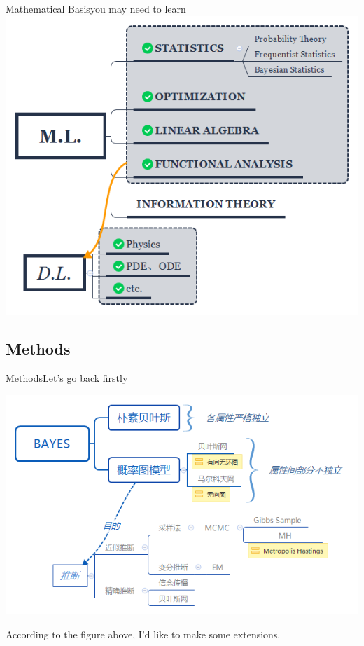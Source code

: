 \documentclass{beamer}
\begin{document}
\begin{frame}{Mathematical Basis}{\quad \quad \quad you may need to learn}
\includegraphics[scale=.42]{fig/math.png}
\end{frame}


\subsection{Methods}
\begin{frame}{Methods}{\quad \quad \quad Let\rq{}s go back firstly}

\includegraphics[scale=.45]{fig/Bayes.png}

According to the figure above, I\rq{}d like to make some extensions.

\end{frame}
\end{document}
